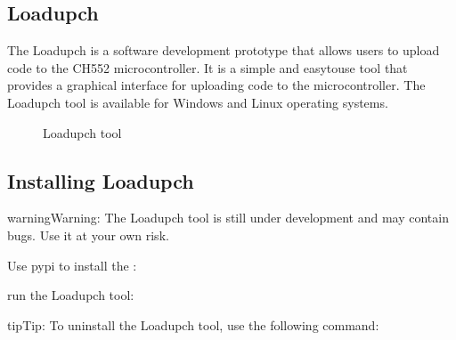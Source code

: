 \documentclass[letterpaper,10pt,english]{sphinxmanual}
\begin{document}
\subsection{Loadupch}
\label{\detokenize{compile:loadupch}}
\sphinxAtStartPar
The Loadupch is a software development prototype that allows users to upload code to the CH552 microcontroller. It is a simple and easy\sphinxhyphen{}to\sphinxhyphen{}use tool that provides a graphical interface for uploading code to the microcontroller. The Loadupch tool is available for Windows and Linux operating systems.

\begin{figure}[htbp]
\centering
\capstart

\noindent{}
\caption{Loadupch tool}\label{\detokenize{compile:id4}}\label{\detokenize{compile:id1}}\end{figure}


\subsection{Installing Loadupch}
\label{\detokenize{compile:installing-loadupch}}
\begin{sphinxadmonition}{warning}{Warning:}
\sphinxAtStartPar
The Loadupch tool is still under development and may contain bugs. Use it at your own risk.
\end{sphinxadmonition}

\sphinxAtStartPar
Use pypi to install the :

\begin{sphinxVerbatim}[commandchars=\\\{\}]
  
\end{sphinxVerbatim}

\sphinxAtStartPar
run the Loadupch tool:

\begin{sphinxVerbatim}[commandchars=\\\{\}]
  
\end{sphinxVerbatim}

\begin{sphinxadmonition}{tip}{Tip:}
\sphinxAtStartPar
To uninstall the Loadupch tool, use the following command:

\begin{sphinxVerbatim}[commandchars=\\\{\}]
  
\end{sphinxVerbatim}
\end{sphinxadmonition}
\end{document}
